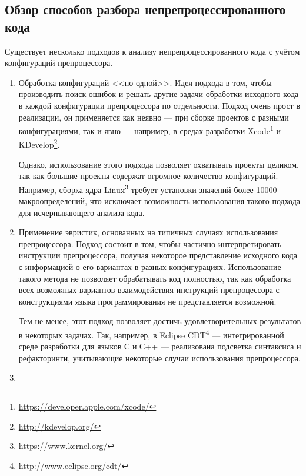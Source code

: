 \subsection{Обзор способов разбора непрепроцессированного кода}
\label{subsec:unpreprocessed_parsing_methods}

Существует несколько подходов к анализу непрепроцессированного кода с учётом конфигураций препроцессора.

\begin{enumerate}

\item 

Обработка конфигураций <<по одной>>. Идея подхода в том, чтобы производить поиск ошибок и решать другие задачи обработки исходного кода в каждой конфигурации препроцессора по отдельности. Подход очень прост в реализации, он применяется как неявно --- при сборке проектов с разными конфигурациями, так и явно --- например, в средах разработки Xcode\footnote{\url{https://developer.apple.com/xcode/}} и KDevelop\footnote{\url{http://kdevelop.org/}}.

Однако, использование этого подхода позволяет охватывать проекты целиком, так как большие проекты содержат огромное количество конфигураций. Например, сборка ядра Linux\footnote{\url{https://www.kernel.org/}} требует установки значений более 10000 макроопределений\cite{typechef}, что исключает возможность использования такого подхода для исчерпывающего анализа кода.

\item

Применение эвристик, основанных на типичных случаях использования препроцессора. Подход состоит в том, чтобы частично интерпретировать инструкции препроцессора, получая некоторое представление исходного кода с информацией о его вариантах в разных конфигурациях. Использование такого метода не позволяет обрабатывать код полностью, так как обработка всех возможных вариантов взаимодействия инструкций препроцессора с конструкциями языка программирования не представляется возможной.

Тем не менее, этот подход позволяет достичь удовлетворительных результатов в некоторых задачах. Так, например, в Eclipse CDT\footnote{\url{http://www.eclipse.org/cdt/}} --- интегрированной среде разработки для языков С и С++ --- реализована подсветка синтаксиса и рефакторинги, учитывающие некоторые случаи использования препроцессора.

\item


\end{enumerate}
